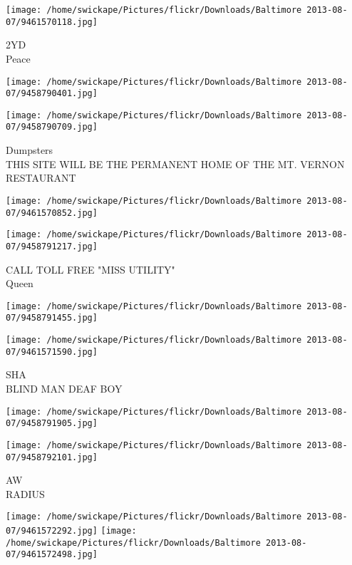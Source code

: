 \documentclass[10pt,letterpaper]{article}
\begin{document}
\vspace{0.25in}
\texttt{[image: /home/swickape/Pictures/flickr/Downloads/Baltimore 2013-08-07/9461570118.jpg]}

2YD\\
Peace\\
\pagebreak

\texttt{[image: /home/swickape/Pictures/flickr/Downloads/Baltimore 2013-08-07/9458790401.jpg]}

\vspace{0.25in}
\texttt{[image: /home/swickape/Pictures/flickr/Downloads/Baltimore 2013-08-07/9458790709.jpg]}

Dumpsters\\
THIS SITE WILL BE THE PERMANENT HOME OF THE MT. VERNON RESTAURANT\\
\pagebreak

\texttt{[image: /home/swickape/Pictures/flickr/Downloads/Baltimore 2013-08-07/9461570852.jpg]}

\vspace{0.25in}
\texttt{[image: /home/swickape/Pictures/flickr/Downloads/Baltimore 2013-08-07/9458791217.jpg]}

CALL TOLL FREE "MISS UTILITY"\\
Queen\\
\pagebreak

\texttt{[image: /home/swickape/Pictures/flickr/Downloads/Baltimore 2013-08-07/9458791455.jpg]}

\vspace{0.25in}
\texttt{[image: /home/swickape/Pictures/flickr/Downloads/Baltimore 2013-08-07/9461571590.jpg]}

SHA\\
BLIND MAN DEAF BOY\\
\pagebreak

\texttt{[image: /home/swickape/Pictures/flickr/Downloads/Baltimore 2013-08-07/9458791905.jpg]}

\vspace{0.25in}
\texttt{[image: /home/swickape/Pictures/flickr/Downloads/Baltimore 2013-08-07/9458792101.jpg]}

AW\\
RADIUS\\
\pagebreak

\texttt{[image: /home/swickape/Pictures/flickr/Downloads/Baltimore 2013-08-07/9461572292.jpg]}
\texttt{[image: /home/swickape/Pictures/flickr/Downloads/Baltimore 2013-08-07/9461572498.jpg]}
\end{document}
